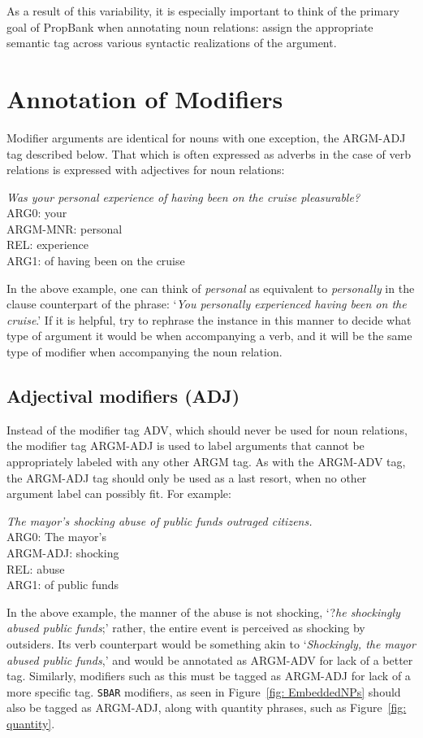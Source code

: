 \documentclass[11pt]{report}
\begin{document}
As a result of this variability, it is especially important to think of the primary goal of PropBank when annotating noun relations: assign the appropriate semantic tag across various syntactic realizations of the argument. 

\section{Annotation of Modifiers}
Modifier arguments are identical for nouns with one exception, the ARGM-ADJ tag described below.  That which is often expressed as adverbs in the case of verb relations is expressed with adjectives for noun relations: 

\textit{Was your personal experience of having been on the cruise pleasurable?}\\
ARG0: your\\
ARGM-MNR: personal\\
REL: experience\\
ARG1: of having been on the cruise

In the above example, one can think of \textit{personal} as equivalent to \textit{personally} in the clause counterpart of the phrase: `\textit{You personally experienced having been on the cruise}.'  If it is helpful, try to rephrase the instance in this manner to decide what type of argument it would be when accompanying a verb, and it will be the same type of modifier when accompanying the noun relation. 

\subsection{Adjectival modifiers (ADJ)}
\label{ssec: ADJ}

Instead of the modifier tag ADV, which should never be used for noun relations, the modifier tag ARGM-ADJ is used to label arguments that cannot be appropriately labeled with any other ARGM tag.  As with the ARGM-ADV tag, the ARGM-ADJ tag should only be used as a last resort, when no other argument label can possibly fit.  For example: 

\textit{The mayor's shocking abuse of public funds outraged citizens.}\\
ARG0: The mayor's\\
ARGM-ADJ: shocking\\
REL: abuse\\
ARG1: of public funds

In the above example, the manner of the abuse is not shocking, `?\textit{he shockingly abused public funds};' rather, the entire event is perceived as shocking by outsiders.  Its verb counterpart would be something akin to `\textit{Shockingly, the mayor abused public funds},' and would be annotated as ARGM-ADV for lack of a better tag.  Similarly, modifiers such as this must be tagged as ARGM-ADJ for lack of a more specific tag.  \texttt{SBAR} modifiers, as seen in Figure~\ref{fig: EmbeddedNPs} should also be tagged as ARGM-ADJ, along with quantity phrases, such as Figure~\ref{fig: quantity}.
\end{document}
